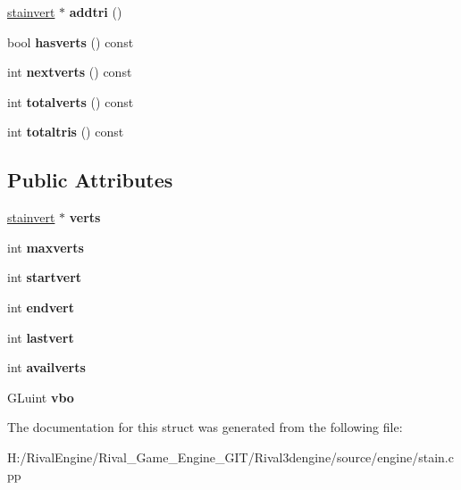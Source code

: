 \begin{DoxyCompactItemize}
\hyperlink{structstainvert}{stainvert} $\ast$ {\bfseries addtri} ()
\item 
\mbox{\label{structstainbuffer_a8083537ad792180bcdc7a1b1a7fba3c6}} 
bool {\bfseries hasverts} () const
\item 
\mbox{\label{structstainbuffer_a39e735e0e09e946ca221f361985caa9b}} 
int {\bfseries nextverts} () const
\item 
\mbox{\label{structstainbuffer_a583e96f7993a90f02492d9dd611f62c1}} 
int {\bfseries totalverts} () const
\item 
\mbox{\label{structstainbuffer_acc8811c1b7bd93a3bdc90cf876b8a809}} 
int {\bfseries totaltris} () const
\end{DoxyCompactItemize}
\subsection*{Public Attributes}
\begin{DoxyCompactItemize}
\item 
\mbox{\label{structstainbuffer_a5d15725734915713409ab143f56828f3}} 
\hyperlink{structstainvert}{stainvert} $\ast$ {\bfseries verts}
\item 
\mbox{\label{structstainbuffer_a04cefd74c8cf45bddebcab1c45107d38}} 
int {\bfseries maxverts}
\item 
\mbox{\label{structstainbuffer_a54b88009319bf65b4ea827ef0a0c12d5}} 
int {\bfseries startvert}
\item 
\mbox{\label{structstainbuffer_a2f57b969f78c2c769f37c55da511de7b}} 
int {\bfseries endvert}
\item 
\mbox{\label{structstainbuffer_ab842dada554fd63f4e86d72b4353a577}} 
int {\bfseries lastvert}
\item 
\mbox{\label{structstainbuffer_ad4f3048fdab5448d2abbee9e7f5417c2}} 
int {\bfseries availverts}
\item 
\mbox{\label{structstainbuffer_ad9303768a0e1c7708d5cc7979c513713}} 
G\+Luint {\bfseries vbo}
\end{DoxyCompactItemize}


The documentation for this struct was generated from the following file\+:\begin{DoxyCompactItemize}
\item 
H\+:/\+Rival\+Engine/\+Rival\+\_\+\+Game\+\_\+\+Engine\+\_\+\+G\+I\+T/\+Rival3dengine/source/engine/stain.\+cpp\end{DoxyCompactItemize}
